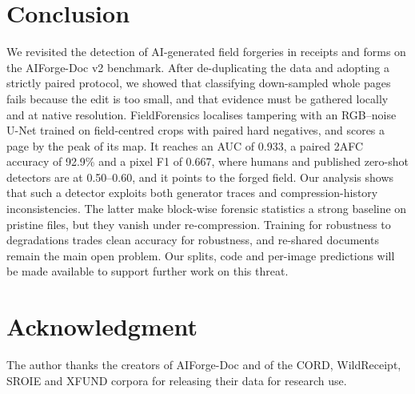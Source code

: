 \documentclass[conference]{IEEEtran}
\begin{document}
\section{Conclusion}\label{sec:concl}
We revisited the detection of AI-generated field forgeries in receipts and forms on the AIForge-Doc v2 benchmark. After de-duplicating the data and adopting a strictly paired protocol, we showed that classifying down-sampled whole pages fails because the edit is too small, and that evidence must be gathered locally and at native resolution. FieldForensics localises tampering with an RGB--noise U-Net trained on field-centred crops with paired hard negatives, and scores a page by the peak of its map. It reaches an AUC of 0.933, a paired 2AFC accuracy of 92.9\% and a pixel F1 of 0.667, where humans and published zero-shot detectors are at 0.50--0.60, and it points to the forged field. Our analysis shows that such a detector exploits both generator traces and compression-history inconsistencies. The latter make block-wise forensic statistics a strong baseline on pristine files, but they vanish under re-compression. Training for robustness to degradations trades clean accuracy for robustness, and re-shared documents remain the main open problem. Our splits, code and per-image predictions will be made available to support further work on this threat.

\section*{Acknowledgment}
The author thanks the creators of AIForge-Doc and of the CORD, WildReceipt, SROIE and XFUND corpora for releasing their data for research use.
\end{document}
